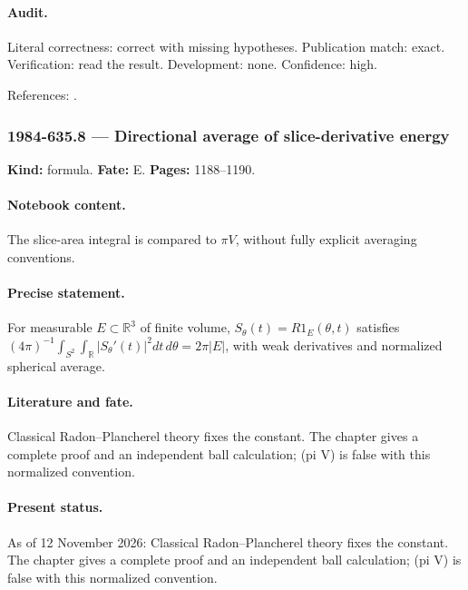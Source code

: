 \paragraph{Audit.} Literal correctness: correct with missing hypotheses. Publication match: exact. Verification: read the result. Development: none. Confidence: high.

\noindent References: \citep{teleman1983signature}.\par

\subsubsection{1984-635.8 --- Directional average of slice-derivative energy}

\label{item:1984-635.8}

\noindent\textbf{Kind:} formula. \textbf{Fate:} E. \textbf{Pages:} 1188--1190.\par

\paragraph{Notebook content.} The slice-area integral is compared to \(\pi V\), without fully explicit averaging conventions.

\paragraph{Precise statement.} For measurable \(E\subset\mathbb R^3\) of finite volume, \(S_\theta(t)=R1_E(\theta,t)\) satisfies \((4\pi)^{-1}\int_{S^2}\int_{\mathbb R}|S_\theta'(t)|^2dt\,d\theta=2\pi|E|\), with weak derivatives and normalized spherical average.

\paragraph{Literature and fate.} Classical Radon--Plancherel theory fixes the constant. The chapter gives a complete proof and an independent ball calculation; (pi V) is false with this normalized convention.

\paragraph{Present status.} As of 12 November 2026: Classical Radon--Plancherel theory fixes the constant. The chapter gives a complete proof and an independent ball calculation; (pi V) is false with this normalized convention.

